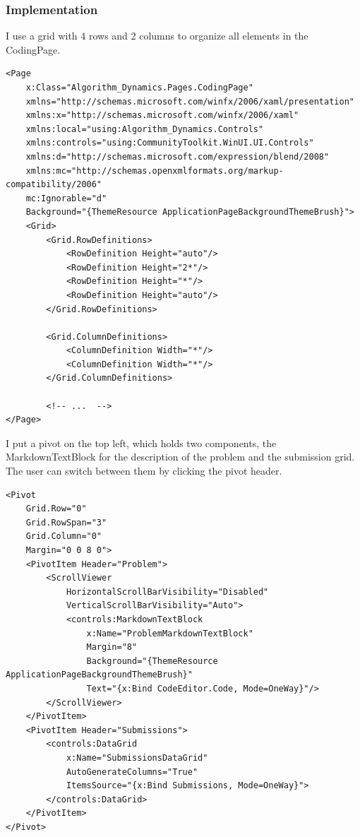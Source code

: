 \documentclass[a4paper]{report}
\begin{document}
\subsubsection{Implementation}

I use a grid with 4 rows and 2 columns to organize all elements in the CodingPage.

\begin{verbatim}
<Page
    x:Class="Algorithm_Dynamics.Pages.CodingPage"
    xmlns="http://schemas.microsoft.com/winfx/2006/xaml/presentation"
    xmlns:x="http://schemas.microsoft.com/winfx/2006/xaml"
    xmlns:local="using:Algorithm_Dynamics.Controls"
    xmlns:controls="using:CommunityToolkit.WinUI.UI.Controls"
    xmlns:d="http://schemas.microsoft.com/expression/blend/2008"
    xmlns:mc="http://schemas.openxmlformats.org/markup-compatibility/2006"
    mc:Ignorable="d"
    Background="{ThemeResource ApplicationPageBackgroundThemeBrush}">
    <Grid>
        <Grid.RowDefinitions>
            <RowDefinition Height="auto"/>
            <RowDefinition Height="2*"/>
            <RowDefinition Height="*"/>
            <RowDefinition Height="auto"/>
        </Grid.RowDefinitions>

        <Grid.ColumnDefinitions>
            <ColumnDefinition Width="*"/>
            <ColumnDefinition Width="*"/>
        </Grid.ColumnDefinitions>

        <!-- ...  -->
</Page>
\end{verbatim}

I put a pivot on the top left, which holds two components, the MarkdownTextBlock for the description of the problem and the submission grid. The user can switch between them by clicking the pivot header.

\begin{verbatim}
<Pivot
    Grid.Row="0"
    Grid.RowSpan="3"
    Grid.Column="0"
    Margin="0 0 8 0">
    <PivotItem Header="Problem">
        <ScrollViewer
            HorizontalScrollBarVisibility="Disabled"
            VerticalScrollBarVisibility="Auto">
            <controls:MarkdownTextBlock
                x:Name="ProblemMarkdownTextBlock"
                Margin="8"
                Background="{ThemeResource ApplicationPageBackgroundThemeBrush}"
                Text="{x:Bind CodeEditor.Code, Mode=OneWay}"/>
        </ScrollViewer>
    </PivotItem>
    <PivotItem Header="Submissions">
        <controls:DataGrid
            x:Name="SubmissionsDataGrid"
            AutoGenerateColumns="True"
            ItemsSource="{x:Bind Submissions, Mode=OneWay}">
        </controls:DataGrid>
    </PivotItem>
</Pivot>
\end{verbatim}
\end{document}
